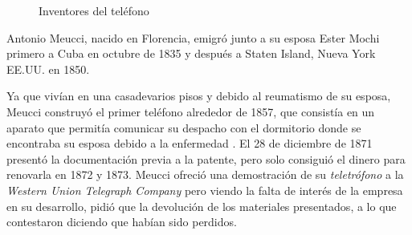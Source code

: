 \begin{figure}[h!btp]
	\begin{adjustbox}{minipage=\linewidth, fbox}
		\centering
		\hspace{10mm}
	\end{adjustbox}
\caption{Inventores del teléfono}
	\label{fig:telefono}
\end{figure}

Antonio Meucci, nacido en Florencia, emigró junto a su esposa Ester Mochi primero a Cuba en octubre de 1835 y después a Staten Island, Nueva York \ac{EE.UU.} en 1850.

Ya que vivían en una casadevarios pisos y debido al reumatismo de su esposa, Meucci construyó el primer teléfono alrededor de 1857, que consistía en un aparato que permitía comunicar su despacho con el  dormitorio donde se encontraba su esposa debido a la enfermedad \cite{Meuc10}. El 28 de diciembre de 1871 presentó la documentación previa a la patente, pero solo consiguió el dinero para renovarla en 1872 y 1873. Meucci ofreció una demostración de su \textit{teletrófono} a la \textit{Western Union Telegraph Company} pero viendo la falta de interés de la empresa en su desarrollo, pidió que la devolución de los materiales presentados, a lo que contestaron diciendo que habían sido perdidos.


